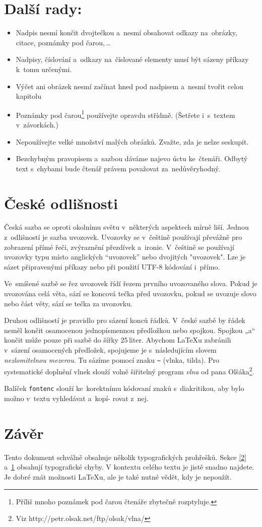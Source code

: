 \documentclass[a4paper, 10 pt, twocolumn]{article}
\begin{document}
\section{Další rady:} \label{3}
\begin{itemize}
\item Nadpis nesmí končit dvojtečkou a~nesmí obsahovat
odkazy na~obrázky, citace, poznámky pod čarou,\,\dots
\item Nadpisy, číslování a~odkazy na~číslované elementy
musí být sázeny příkazy k~tomu určenými.
\item Výčet ani obrázek nesmí začínat hned pod nadpisem
a~nesmí tvořit celou kapitolu
\item Poznámky pod čarou\footnote{Příliš mnoho poznámek pod čarou čtenáře zbytečně rozptyluje.} používejte opravdu střídmě.
(Šetřete i~s~textem v~závorkách.)
\item Nepoužívejte velké množství malých obrázků. Zvažte,
zda je nelze seskupit.
\item Bezchybným pravopisem a~sazbou dáváme najevo
úctu ke~čtenáři. Odbytý text s~chybami bude čtenář
právem považovat za~nedůvěryhodný.
\end{itemize}

\section{České odlišnosti}
Česká sazba se oproti okolnímu světu v~některých aspektech
mírně liší. Jednou z~odlišností je sazba uvozovek. Uvozovky
se v~češtině používají převážně pro zobrazení přímé
řeči, zvýraznění přezdívek a~ironie. V~češtině se používají
uvozovky typu  místo anglických ``uvozovek'' nebo
dvojitých "uvozovek". Lze je sázet připravenými příkazy
nebo při použití UTF-8 kódování i~přímo.
\par Ve~smíšené sazbě se řez uvozovek řídí řezem prvního
uvozovaného slova. Pokud je uvozována celá věta, sází se
koncová tečka před uvozovku, pokud se uvozuje slovo nebo
část věty, sází se tečka za uvozovku.
\par Druhou odlišností je pravidlo pro sázení konců řádků.
V~české sazbě by řádek neměl končit osamocenou jednopísmennou
předložkou nebo spojkou. Spojkou „a“ končit
může pouze při sazbě do šířky 25\,liter. Abychom {\LaTeX}u
zabránili v~sázení osamocených předložek, spojujeme je
s~následujícím slovem \textit{nezlomitelnou mezerou}. Tu sázíme
pomocí znaku \verb|~| (vlnka, tilda).
Pro systematické doplnění
vlnek slouží volně šiřitelný program \textit{vlna} od pana Olšáka\footnote{Viz http://petr.olsak.net/ftp/olsak/vlna/
}.
\par Balíček \texttt{fontenc} slouží ke~korektnímu kódovaní znaků
s~diakritikou, aby bylo možno v~textu vyhledávat a~kopí-
rovat z~nej.

\section{Závěr}
Tento dokument schválně obsahuje několik typografických
prohřešků. Sekce \ref{2} a~\ref{3} obsahují typografické chyby. V kontextu
celého textu je jistě snadno najdete. Je dobré znát
možnosti {\LaTeX}u, ale je také nutné vědět, kdy je nepoužít.
\end{document}
